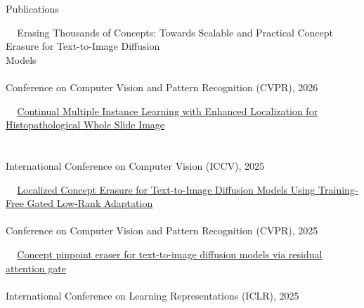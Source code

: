\documentclass{resume} %
\newcommand{\mycolor}[1]{\textcolor{myurlcolor}{#1}}
\begin{document}
\begin{rSection}{Publications {}}


\textbullet~\,\, \mycolor{Erasing Thousands of Concepts: Towards Scalable and Practical Concept Erasure for Text-to-Image Diffusion}
\\ \hspace*{1.5em}\mycolor{Models}
\\ 
\\ \hspace*{1.5em}Conference on Computer Vision and Pattern Recognition (CVPR), 2026



\textbullet~\,\, \href{https://arxiv.org/pdf/2507.02395}{Continual Multiple Instance Learning with Enhanced Localization for Histopathological Whole Slide Image \\ \hspace*{1.5em}{Analysis}} 
\\ 
\\ \hspace*{1.5em} International Conference on Computer Vision (ICCV), 2025

\textbullet~\,\, \href{https://arxiv.org/abs/2503.12356}{Localized Concept Erasure for Text-to-Image Diffusion Models Using Training-Free Gated Low-Rank Adaptation}
\\ 
\\ \hspace*{1.5em}Conference on Computer Vision and Pattern Recognition (CVPR), 2025

\textbullet~\,\, \href{https://openreview.net/pdf?id=ZRDhBwKs7l}{Concept pinpoint eraser for text-to-image diffusion models via residual attention gate}
\\ 
\\ \hspace*{1.5em}International Conference on Learning Representations (ICLR), 2025


\end{rSection}
\end{document}
